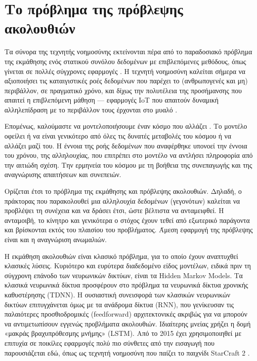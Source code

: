 \section{Το πρόβλημα της πρόβλεψης ακολουθιών}

	Τα σύνορα της τεχνητής νοημοσύνης εκτείνονται πέρα από το παραδοσιακό πρόβλημα της εκμάθησης ενός στατικού συνόλου δεδομένων με επιβλεπόμενες μεθόδους,
	όπως γίνεται σε πολλές σύγχρονες εφαρμογές \parencite{lecun}.
	Η τεχνητή νοημοσύνη καλείται σήμερα να αξιοποιήσει τις καταιγιστικές ροές δεδομένων που παρέχει το (ανθρωπογενές και μη) περιβάλλον, σε πραγματικό χρόνο,
	και δίχως την πολυτέλεια της προσήμανσης που απαιτεί η επιβλεπόμενη μάθηση ---
	εφαρμογές IoT που απαιτούν δυναμική αλληλεπίδραση με το περιβάλλον τους έρχονται στο μυαλό \parencite{mohammadiDeepLearningIoT2018}.

	Επομένως, καλούμαστε να μοντελοποιήσουμε έναν κόσμο που αλλάζει \parencite{staticbottleneck}.
	Το μοντέλο οφείλει ή να είναι γενικότερο από όλες τις δυνατές μεταβολές του κόσμου ή να αλλάζει μαζί του.
	Η έννοια της ροής δεδομένων που αναφέρθηκε υπονοεί την έννοια του χρόνου, της αλληλουχίας, που επιτρέπει στο μοντέλο να αντλήσει πληροφορία από την αιτιώδη σχέση.
	Την ερμηνεία του κόσμου με τη βοήθεια της συνεπαγωγής και της αναγνώρισης απαιτήσεων και συνεπειών.

	Ορίζεται έτσι το πρόβλημα της εκμάθησης και πρόβλεψης ακολουθιών.
	Δηλαδή, ο πράκτορας που παρακολουθεί μια αλληλουχία δεδομένων (γεγονότων) καλείται να προβλέψει τη συνέχεια και να δράσει έτσι, ώστε βέλτιστα να ανταμειφθεί.
	Η ανταμοιβή, το κίνητρο και γενικότερα ο στόχος έχουν τεθεί από εξωτερικό παράγοντα και βρίσκονται εκτός του πλαισίου του προβλήματος.
	Άμεση εφαρμογή της πρόβλεψης είναι και η αναγνώριση ανωμαλιών.

	Η εκμάθηση ακολουθιών είναι κλασικό πρόβλημα, για το οποίο έχουν αναπτυχθεί κλασικές λύσεις.
	Κυριότερο και ευρύτερα διαδεδομένο είδος μοντέλων, ειδικά πριν τη σύγχρονη επάνοδο των νευρωνικών δικτύων, είναι τα Hidden Markov Models.
	Τα κλασικά νευρωνικά δίκτυα προσφέρουν στο πρόβλημα τα νευρωνικά δίκτυα χρονικής καθυστέρησης (TDNN).
	Η ουσιαστική συνεισφορά των κλασικών νευρωνικών δικτύων επιτυγχάνεται όμως με τα ανάδρομα δίκτυα (RNN),
	που γενίκευσαν τις παλαιότερες προσθιοδρομικές (feedforward) αρχιτεκτονικές ακριβώς για να μπορούν να αντιμετωπίσουν εγγενώς προβλήματα ακολουθιών.
	Ιδιαίτερης μνείας χρήζει η δομή «μακράς βραχυπρόθεσμης μνήμης» (LSTM).
	Από το 2015 έχει χρησιμοποιηθεί με επιτυχία σε ποικίλες εφαρμογές πολύ πιο σύνθετες από την εισαγωγή που παρουσιάζεται εδώ,
	όπως ως τεχνητή νοημοσύνη που παίζει το παιχνίδι StarCraft 2 \parencite[AlphaStar][]{vinyalsAlphaStarMasteringRealTime2019}.

